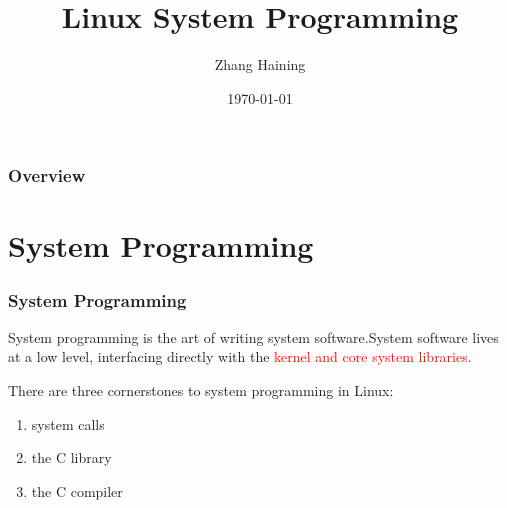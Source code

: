 \documentclass{beamer}
\title[Linux System Programming]{Linux System Programming} %
\author{Zhang Haining} %
\institute[cs.gzu] %
{
Guizhou University \\ %
\medskip
\textit{hnzhang1@gzu.edu.cn} %
}
\date{\today} %
\begin{document}
\begin{frame}
\titlepage %
\end{frame}

\begin{frame}
\frametitle{Overview} %
\tableofcontents %
\end{frame}


\section{System Programming} %
\begin{frame}
\frametitle{System Programming}
System programming is the art of writing system software.System software lives at a low level, interfacing directly with the \textcolor{red}{kernel and core system libraries}.

There are three cornerstones to system programming in Linux: 
\begin{enumerate}
\item system calls
\item the C library
\item the C compiler
\end{enumerate} 
\end{frame}
\end{document}
